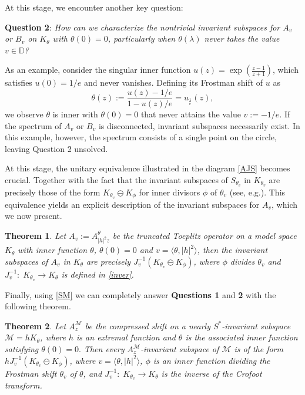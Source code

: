 \documentclass[12pt,reqno]{amsart}
\newtheorem{thm}{Theorem}[section]
\theoremstyle{definition}
\theoremstyle{remark}
\numberwithin{equation}{section}
\newcommand{\la}{\langle}
\newcommand{\ra}{\rangle}
\newcommand{\ma}{\mathcal}
\begin{document}
At this stage, we encounter another key question:
\begin{center}
  \textbf{ Question 2}: \textit{How can we characterize the nontrivial invariant subspaces for $A_v$ or $B_v$ on $K_\theta$ with $\theta(0)=0$, particularly when $\theta(\lambda)$ never takes the value $v\in \mathbb{D} $?}
\end{center}

As an example, consider the singular inner function $u(z)=\exp(\frac{z-1}{z+1})$, which satisfies $u(0)=1/e$ and never vanishes.  Defining its Frostman shift of   $u$ as $$\theta(z):= \frac{u(z)-1/e}{1-u(z)/e}=u_{\frac{1}{e}}(z),$$ we observe $\theta$ is inner with $\theta(0)=0$ that never attains the value $v:=-1/e$.  If the spectrum of $A_v$ or $B_v$ is disconnected,   invariant subspaces necessarily exist. In this example, however,  the spectrum consists of a single point on the circle, leaving Question 2 unsolved.

At this stage, the unitary equivalence illustrated in the diagram \eqref{AJS} becomes crucial. Together with the fact that the invariant subspaces of $S_{\theta_v}$ in $K_{\theta_v}$ are precisely those of the form $K_{\theta_v} \ominus K_\phi$ for inner divisors $\phi$ of $\theta_v$ (see, e.g.\cite[Proposition 9.14]{GMR}). This equivalence yields an explicit description of the invariant subspaces for $A_v$, which we now present.

\begin{thm} Let $A_v:=A_{|h|^2 z}^\theta$ be the truncated Toeplitz operator on a  model space $K_\theta$ with  inner function $\theta$, $\theta(0)=0$ and $v=\la \theta, |h|^2 \ra$, then the invariant subspaces of $A_v$ in $K_{\theta}$ are precisely $J_v^{-1}(K_{\theta_v} \ominus K_\phi)$, where $\phi$ divides $\theta_v$ and $J_v^{-1}:\; K_{\theta_v}\rightarrow K_\theta$ is defined in \eqref{inver}.\end{thm}

Finally, using \eqref{SM} we  can completely  answer \textbf{Questions 1} and \textbf{2} with the following theorem.

\begin{thm}\label{thm com} Let $A_z^\ma{M}$ be the compressed shift on a nearly $S^*$-invariant subspace $\ma{M}=hK_\theta$, where $h$ is an extremal function and $\theta$ is the associated inner function satisfying $\theta(0)=0.$ Then every $A_z^\ma{M}$-invariant subspace of $\ma{M}$ is of the form $h J_v^{-1}(K_{\theta_v} \ominus K_\phi)$, where $v=\la \theta, |h|^2 \ra$, $\phi$ is an inner function dividing the Frostman shift $\theta_v$ of $\theta$, and $J_v^{-1}:\; K_{\theta_v}\rightarrow K_\theta$ is the inverse of the Crofoot transform.\end{thm}
\end{document}
